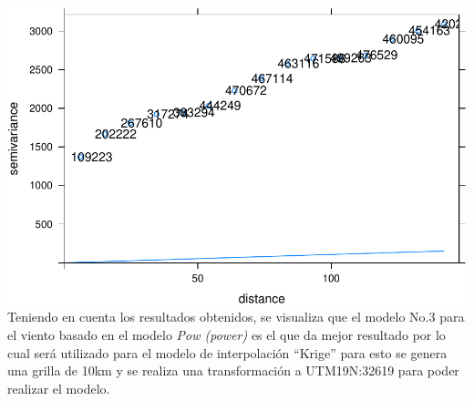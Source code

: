 \documentclass[11pt,]{article}
\begin{document}
\includegraphics{proyecto_files/figure-latex/unnamed-chunk-44-2.pdf}
Teniendo en cuenta los resultados obtenidos, se visualiza que el modelo
No.3 para el viento basado en el modelo \emph{Pow (power)} es el que da
mejor resultado por lo cual será utilizado para el modelo de
interpolación ``Krige'' para esto se genera una grilla de 10km y se
realiza una transformación a UTM19N:32619 para poder realizar el modelo.
\end{document}
